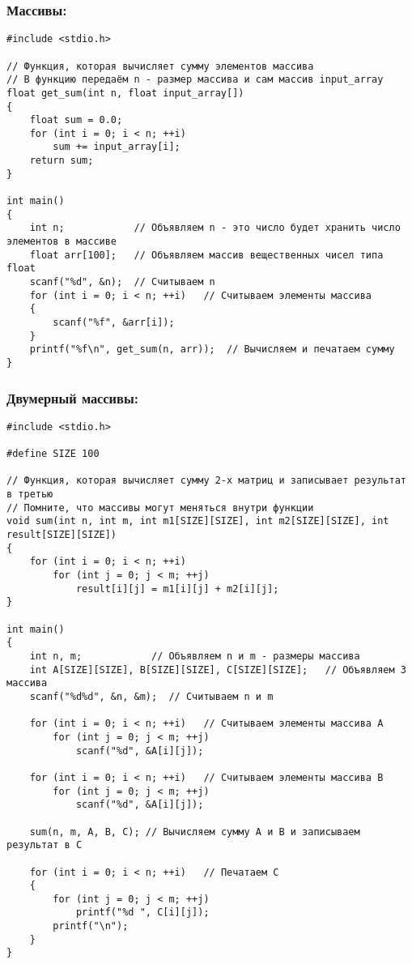 \documentclass{article}
\begin{document}
\subsubsection*{Массивы:}
\begin{verbatim}
#include <stdio.h>

// Функция, которая вычисляет сумму элементов массива
// В функцию передаём n - размер массива и сам массив input_array
float get_sum(int n, float input_array[])
{
    float sum = 0.0;
    for (int i = 0; i < n; ++i)
        sum += input_array[i];
    return sum;
}

int main()
{
    int n;            // Объявляем n - это число будет хранить число элементов в массиве
    float arr[100];   // Объявляем массив вещественных чисел типа float
    scanf("%d", &n);  // Считываем n
    for (int i = 0; i < n; ++i)   // Считываем элементы массива
    {
        scanf("%f", &arr[i]);
    }
    printf("%f\n", get_sum(n, arr));  // Вычисляем и печатаем сумму
}
\end{verbatim}

\newpage
\subsubsection*{Двумерный массивы:}
\begin{verbatim}
#include <stdio.h>

#define SIZE 100

// Функция, которая вычисляет сумму 2-х матриц и записывает результат в третью
// Помните, что массивы могут меняться внутри функции
void sum(int n, int m, int m1[SIZE][SIZE], int m2[SIZE][SIZE], int result[SIZE][SIZE])
{
    for (int i = 0; i < n; ++i)
        for (int j = 0; j < m; ++j)
            result[i][j] = m1[i][j] + m2[i][j];
}

int main()
{
    int n, m;            // Объявляем n и m - размеры массива
    int A[SIZE][SIZE], B[SIZE][SIZE], C[SIZE][SIZE];   // Объявляем 3 массива
    scanf("%d%d", &n, &m);  // Считываем n и m
    
    for (int i = 0; i < n; ++i)   // Считываем элементы массива A
        for (int j = 0; j < m; ++j)
            scanf("%d", &A[i][j]);
            
    for (int i = 0; i < n; ++i)   // Считываем элементы массива B
        for (int j = 0; j < m; ++j)
            scanf("%d", &A[i][j]);
            
    sum(n, m, A, B, C); // Вычисляем сумму A и B и записываем результат в C
    
    for (int i = 0; i < n; ++i)   // Печатаем C
    {
        for (int j = 0; j < m; ++j)
            printf("%d ", C[i][j]);
        printf("\n");
    }
}
\end{verbatim}
\end{document}
